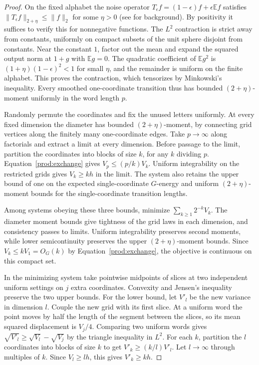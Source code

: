 \begin{proof}
On the fixed alphabet the noise operator
$T_\epsilon f=(1-\epsilon)f+\epsilon\mathbb E f$ satisfies
$\|T_\epsilon f\|_{2+\eta}\le\|f\|_2$ for some $\eta>0$
(see \cite{odon} for background). By positivity it suffices to verify
this for nonnegative functions. The $L^2$ contraction is strict away from constants,
uniformly on compact subsets of the unit sphere disjoint from constants.
Near the constant $1$, factor out the mean and expand the squared
output norm at $1+g$ with $\mathbb E g=0$. The quadratic coefficient
of $\mathbb E g^2$ is $(1+\eta)(1-\epsilon)^2<1$ for small $\eta$,
and the remainder is uniform on the finite alphabet. This proves
the contraction, which tensorizes by Minkowski's inequality. Every
smoothed one-coordinate transition thus has bounded $(2+\eta)$-moment
uniformly in the word length $p$.

Randomly permute the coordinates and fix the unused letters uniformly.
At every fixed dimension the diameter has bounded $(2+\eta)$-moment,
by connecting grid vertices along the finitely many one-coordinate edges.
Take $p\to\infty$ along factorials and extract a limit at every dimension.
Before passage to the limit, partition the coordinates into blocks of
size $k$, for any $k$ dividing $p$. Equation~\eqref{prod:exchange}
gives $V_p\le(p/k)V_k$. Uniform integrability on the restricted grids
gives $V_k\ge kh$ in the limit. The system also retains the upper bound
of one on the expected single-coordinate $G$-energy and uniform
$(2+\eta)$-moment bounds for the single-coordinate transition lengths.

Among systems obeying these three bounds, minimize
$\sum_{k\ge1}2^{-k}V_k$. The diameter moment bounds give tightness
of the grid laws in each dimension, and consistency passes to limits.
Uniform integrability preserves second moments, while lower
semicontinuity preserves the upper $(2+\eta)$-moment bounds. Since
$V_k\le kV_1=O_G(k)$ by Equation~\eqref{prod:exchange}, the objective
is continuous on this compact set.

In the minimizing system take pointwise midpoints of slices at two
independent uniform settings on $j$ extra coordinates. Convexity and
Jensen's inequality preserve the two upper bounds. For the lower bound,
let $V'_l$ be the new variance in dimension $l$. Couple the new grid
with its first slice. At a uniform word the point moves by half the
length of the segment between the slices, so its mean squared
displacement is $V_j/4$. Comparing two uniform words gives
$\sqrt{V'_l}\ge\sqrt{V_l}-\sqrt{V_j}$ by the triangle inequality
in $L^2$. For each $k$, partition the $l$ coordinates into blocks of
size $k$ to get $V'_k\ge(k/l)V'_l$. Let $l\to\infty$ through multiples
of $k$. Since $V_l\ge lh$, this gives $V'_k\ge kh$.


\end{proof}

